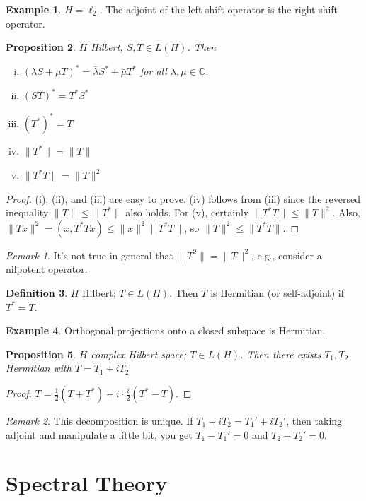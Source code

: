 \documentclass{article}
\theoremstyle{definition}
\newtheorem{defn}{Definition}[section]
\newtheorem{example}[defn]{Example}
\theoremstyle{remark}
\newtheorem{rem}{Remark}
\theoremstyle{plain}
\newtheorem{prop}[defn]{Proposition}
\newcommand{\CC}{\mathbb{C}}
\begin{document}
\begin{example}
    $H=\ell_2$. The adjoint of the left shift operator is the right shift operator.
\end{example}
\begin{prop}
    $H$ Hilbert, $S,T\in L(H)$. Then
    \begin{enumerate}[(i)]
        \item $(\lambda S+\mu T)^\ast =\bar \lambda S^\ast+\bar\mu T^\ast$ for all $\lambda,\mu\in\CC$.
        \item $(ST)^\ast=T^\ast S^\ast$
        \item $(T^\ast)^\ast= T$
        \item $\|T^\ast\|=\|T\|$
        \item $\|T^\ast T\|=\|T\|^2$
    \end{enumerate}
\end{prop}
\begin{proof}
    (i), (ii), and (iii) are easy to prove. (iv) follows from (iii) since the reversed inequality $\|T\|\le \|T^\ast\|$ also holds. For (v), certainly $\|T^\ast T\|\le \|T\|^2$. Also, $\|Tx\|^2=(x,T^\ast T x)\le \|x\|^2\|T^\ast T\|$, so $\|T\|^2\le \|T^\ast T\|$.
\end{proof}
\begin{rem}
    It's not true in general that $\|T^2\|=\|T\|^2$, e.g., consider a nilpotent operator.
\end{rem}
\begin{defn}
    $H$ Hilbert; $T\in L(H)$. Then $T$ is Hermitian (or self-adjoint) if $T^\ast =T$.
\end{defn}
\begin{example}
    Orthogonal projections onto a closed subspace is Hermitian.
\end{example}
\begin{prop}
    $H$ complex Hilbert space; $T\in L(H)$. Then there exists $T_1,T_2$ Hermitian with $T=T_1+iT_2$
\end{prop}
\begin{proof}
    $T=\frac12(T+T^\ast)+i\cdot\frac i2(T^\ast -T)$.
\end{proof}
\begin{rem}
    This decomposition is unique. If $T_1+iT_2=T_1'+iT_2'$, then taking adjoint and manipulate a little bit, you get $T_1-T_1'=0$ and $T_2-T_2'=0$.
\end{rem}

\section{Spectral Theory}

 
\end{document}
